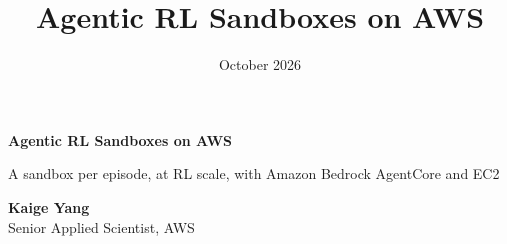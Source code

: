 
\renewcommand{\deckfooter}{Agentic RL sandboxes on AWS \textperiodcentered{} first call}
\newcommand{\deep}[1]{\par\vspace{0.5mm}{\tiny\textcolor{footc}{Deep dive: #1}}}
\newcommand{\settag}[1]{\gdef\secname{#1}}
\newcommand{\chal}[3]{\colorbox{panel}{\parbox[t][25mm]{\dimexpr\linewidth-2\fboxsep}{\raggedright\vspace{1.5mm}%
  {\normalsize\bfseries\color{#1}#2}\par\vspace{1.5mm}\small #3}}}

\title{Agentic RL Sandboxes on AWS}
\date{October 2026}



{
\begin{frame}[plain]
\vspace*{4mm}
\begin{minipage}{0.50\textwidth}\raggedright
{\fontsize{22}{26}\selectfont\bfseries\color{white}Agentic RL Sandboxes on AWS\par}
\vspace{3mm}
{\normalsize\color{white}A sandbox per episode, at RL scale, with Amazon Bedrock AgentCore and EC2\par}
\vspace{8mm}
{\small\color{white}\textbf{Kaige Yang}\\Senior Applied Scientist, AWS\par}
\end{minipage}
\end{frame}}


